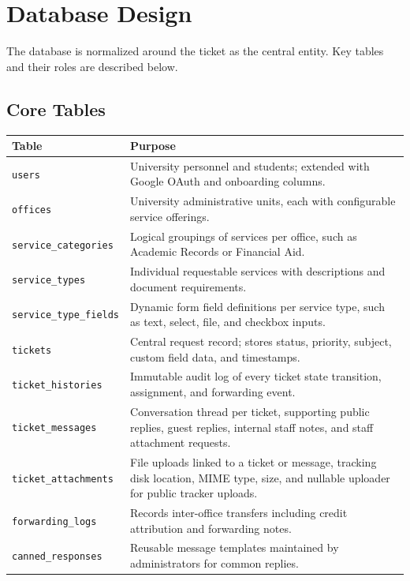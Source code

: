 \documentclass[12pt,a4paper]{article}
\newcommand{\code}[1]{\texttt{#1}}
\begin{document}
\section{Database Design}

The database is normalized around the ticket as the central entity. Key tables and their roles are described below.

\subsection{Core Tables}

\begin{longtable}{@{} p{} p{} @{}}
\toprule
\textbf{Table} & \textbf{Purpose} \\
\midrule
\endhead
\code{users} & University personnel and students; extended with Google OAuth and onboarding columns. \\
\code{offices} & University administrative units, each with configurable service offerings. \\
\code{service\_categories} & Logical groupings of services per office, such as Academic Records or Financial Aid. \\
\code{service\_types} & Individual requestable services with descriptions and document requirements. \\
\code{service\_type\_fields} & Dynamic form field definitions per service type, such as text, select, file, and checkbox inputs. \\
\code{tickets} & Central request record; stores status, priority, subject, custom field data, and timestamps. \\
\code{ticket\_histories} & Immutable audit log of every ticket state transition, assignment, and forwarding event. \\
\code{ticket\_messages} & Conversation thread per ticket, supporting public replies, guest replies, internal staff notes, and staff attachment requests. \\
\code{ticket\_attachments} & File uploads linked to a ticket or message, tracking disk location, MIME type, size, and nullable uploader for public tracker uploads. \\
\code{forwarding\_logs} & Records inter-office transfers including credit attribution and forwarding notes. \\
\code{canned\_responses} & Reusable message templates maintained by administrators for common replies. \\
\bottomrule
\end{longtable}
\end{document}
